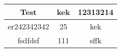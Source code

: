 \begin{tabular}{|c|c|c|}
\hline
Test & kek & 12313214 \\
\hline
er242342342 & 25 & kek \\
\hline
fsdfdsf & 111 & sffk \\
\hline
\end{tabular}